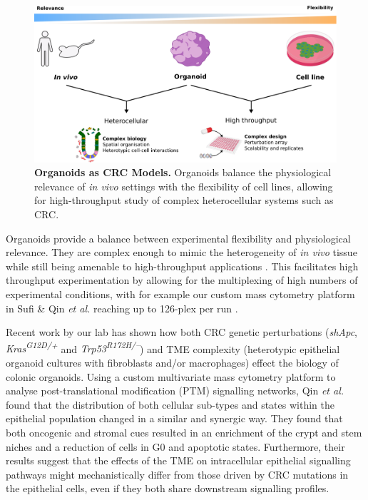 \begin{figure}[H]
    \centering
    \includegraphics{01intro/figs/1BIO_organoids.png}
    \caption{\textbf{Organoids as CRC Models.} Organoids balance the physiological relevance of \emph{in vivo} settings with the flexibility of cell lines, allowing for high-throughput study of complex heterocellular systems such as CRC.}
    \label{fig:1org}
\end{figure}

Organoids provide a balance between experimental flexibility and physiological relevance. They are complex enough to mimic the heterogeneity of \emph{in vivo} tissue while still being amenable to high-throughput applications \cite{qin_deciphering_2020}. This facilitates high throughput experimentation by allowing for the multiplexing of high numbers of experimental conditions, with for example our custom mass cytometry platform in Sufi \& Qin \emph{et al.} reaching up to 126-plex per run \cite{sufi_multiplexed_2021}.

Recent work by our lab \cite{qin_cell-type-specific_2020} has shown how both CRC genetic perturbations (\textit{shApc}, \textit{Kras\textsuperscript{G12D/+}} and \textit{Trp53\textsuperscript{R172H/–}}) and TME complexity (heterotypic epithelial organoid cultures with fibroblasts and/or macrophages) effect the biology of colonic organoids. Using a custom multivariate mass cytometry platform to analyse post-translational modification (PTM) signalling networks, Qin \emph{et al.}~\cite{qin_cell-type-specific_2020} found that the distribution of both cellular sub-types and states within the epithelial population changed in a similar and synergic way. They found that both oncogenic and stromal cues resulted in an enrichment of the crypt and stem niches and a reduction of cells in G0 and apoptotic states. Furthermore, their results suggest that the effects of the TME on intracellular epithelial signalling pathways might mechanistically differ from those driven by CRC mutations in the epithelial cells, even if they both share downstream signalling profiles.

